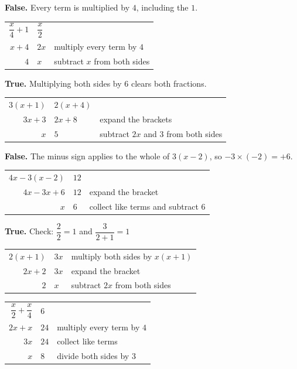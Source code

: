 \documentclass[aspectratio=169]{beamer}
\makeatletter
\newcommand{\steps}[1]{%
  \begin{tabular}{@{}r@{${}={}$}l@{\qquad}l@{}}#1\end{tabular}%
}
\newcommand{\by}[1]{{\normalsize #1}}
\makeatother
\begin{document}
  {\textbf{False.} Every term is multiplied by $4$, including the $1$.
   \par\vspace{0.4em}
   \steps{$\dfrac{x}{4}+1$ & $\dfrac{x}{2}$ & \\[0.95em]
          $x+4$ & $2x$ & \by{multiply every term by $4$}\\
          $4$ & $x$ & \by{subtract $x$ from both sides}}}

  {\textbf{True.} Multiplying both sides by $6$ clears both fractions.
   \par\vspace{0.4em}
   \steps{$3(x+1)$ & $2(x+4)$ & \\
          $3x+3$ & $2x+8$ & \by{expand the brackets}\\
          $x$ & $5$ & \by{subtract $2x$ and $3$ from both sides}}}

  {\textbf{False.} The minus sign applies to the whole of $3(x-2)$, so
   $-3\times(-2)=+6$.
   \par\vspace{0.4em}
   \steps{$4x-3(x-2)$ & $12$ & \\
          $4x-3x+6$ & $12$ & \by{expand the bracket}\\
          $x$ & $6$ & \by{collect like terms and subtract $6$}}}

  {\textbf{True.} Check: $\dfrac{2}{2}=1$ and $\dfrac{3}{2+1}=1$
   \par\vspace{0.4em}
   \steps{$2(x+1)$ & $3x$ & \by{multiply both sides by $x(x+1)$}\\
          $2x+2$ & $3x$ & \by{expand the bracket}\\
          $2$ & $x$ & \by{subtract $2x$ from both sides}}}

  {\steps{$\dfrac{x}{2}+\dfrac{x}{4}$ & $6$ & \\[0.95em]
          $2x+x$ & $24$ & \by{multiply every term by $4$}\\
          $3x$ & $24$ & \by{collect like terms}\\
          $x$ & $8$ & \by{divide both sides by $3$}}}
\end{document}
